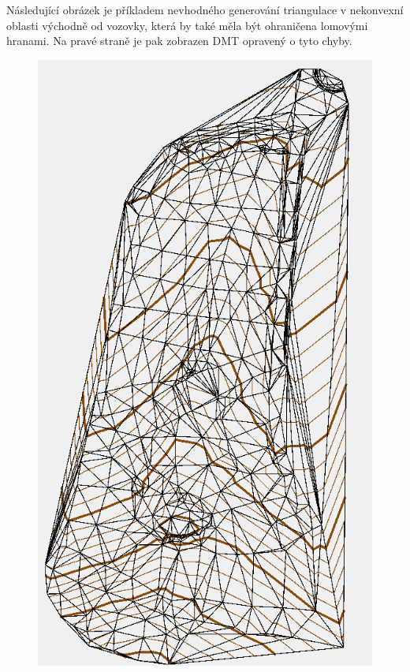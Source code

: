 \documentclass[11pt]{article}
\begin{document}
Následující obrázek je příkladem nevhodného generování triangulace v nekonvexní oblasti východně od vozovky, která by také měla být ohraničena lomovými hranami. Na pravé straně je pak zobrazen DMT opravený o tyto chyby.

\begin{figure}[htbh]
	\centering
	\includegraphics[scale=0.35]{images/chyba_nekonvex.png}

\end{figure}
\end{document}

